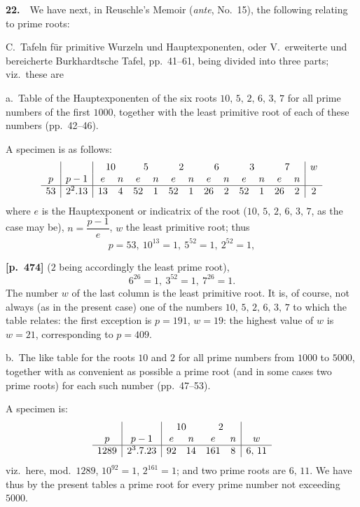 \documentclass[11pt,a4paper]{article}
\begin{document}
\textbf{22.}\ \ We have next, in Reuschle's Memoir (\textit{ante}, No.~15), the following relating to prime roots:

C.\ Tafeln f\"ur primitive Wurzeln und Hauptexponenten, oder V.~erweiterte und bereicherte Burkhardtsche Tafel, pp.~41--61, being divided into three parts; viz.\ these are

a.\ Table of the Hauptexponenten of the six roots $10,\,5,\,2,\,6,\,3,\,7$ for all prime numbers of the first $1000$, together with the least primitive root of each of these numbers (pp.~42--46).

A specimen is as follows:
\[
\begin{array}{c|c|cccccccccccc|c}
  &     & \multicolumn{2}{c}{10} & \multicolumn{2}{c}{5} & \multicolumn{2}{c}{2} & \multicolumn{2}{c}{6} & \multicolumn{2}{c}{3} & \multicolumn{2}{c|}{7} & w \\
p & p-1 & e & n & e & n & e & n & e & n & e & n & e & n &   \\\hline
53 & 2^2.13 & 13 & 4 & 52 & 1 & 52 & 1 & 26 & 2 & 52 & 1 & 26 & 2 & 2
\end{array}
\]
where $e$ is the Hauptexponent or indicatrix of the root ($10,\,5,\,2,\,6,\,3,\,7$, as the case may be), $n=\dfrac{p-1}{e}$, $w$ the least primitive root; thus
\[
p=53,\ 10^{13}=1,\ 5^{52}=1,\ 2^{52}=1,
\]

\bigskip
\noindent\textbf{[p.~474]}\quad
($2$ being accordingly the least prime root),
\[
6^{26}=1,\ 3^{52}=1,\ 7^{26}=1.
\]
The number $w$ of the last column is the least primitive root.   It is, of course, not always (as in the present case) one of the numbers $10,\,5,\,2,\,6,\,3,\,7$ to which the table relates: the first exception is $p=191$, $w=19$: the highest value of $w$ is $w=21$, corresponding to $p=409$.

b.\ The like table for the roots $10$ and $2$ for all prime numbers from $1000$ to $5000$, together with as convenient as possible a prime root (and in some cases two prime roots) for each such number (pp.~47--53).

A specimen is:
\[
\begin{array}{c|c|cccc|c}
  &     & \multicolumn{2}{c}{10} & \multicolumn{2}{c|}{2} &   \\
p & p-1 & e & n & e & n & w \\\hline
1289 & 2^3.7.23 & 92 & 14 & 161 & 8 & 6,\,11
\end{array}
\]
viz.\ here, mod.\ $1289$, $10^{92}=1$, $2^{161}=1$; and two prime roots are $6,\,11$.   We have thus by the present tables a prime root for every prime number not exceeding $5000$.
\end{document}
